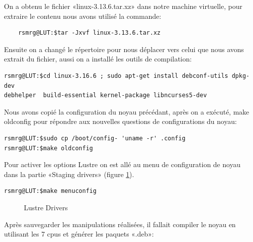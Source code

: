 \documentclass[12pt]{article}
\begin{document}
On a obtenu le fichier «linux-3.13.6.tar.xz» dans notre machine virtuelle, pour extraire le contenu nous avons utilisé la commande:

\begin{verbatim}
	rsmrg@LUT:$tar -Jxvf linux-3.13.6.tar.xz
\end{verbatim}

Ensuite on a changé le répertoire pour nous déplacer vers celui que nous avons extrait du fichier, aussi on a installé les outils de compilation:

\begin{verbatim}
rsmrg@LUT:$cd linux-3.16.6 ; sudo apt-get install debconf-utils dpkg-dev
debhelper  build-essential kernel-package libncurses5-dev
\end{verbatim}

Nous avons copié la configuration du noyau précédant, après on a exécuté, make oldconfig pour répondre aux nouvelles questions de configurations du noyau:

\begin{verbatim}
rsmrg@LUT:$sudo cp /boot/config- 'uname -r' .config
rsmrg@LUT:$make oldconfig
\end{verbatim}

Pour activer les options Lustre on est allé au menu de configuration de noyau dans la partie «Staging drivers» (figure \ref{kernel}).

\begin{verbatim}
rsmrg@LUT:$make menuconfig
\end{verbatim}

\begin{figure}[Lustre Options]
\caption{Lustre Drivers}
\label{kernel}
\end{figure}

Après sauvegarder les manipulations réalisées, il fallait compiler le noyau en utilisant les 7 cpus et générer les paquets «.deb»:
\end{document}
